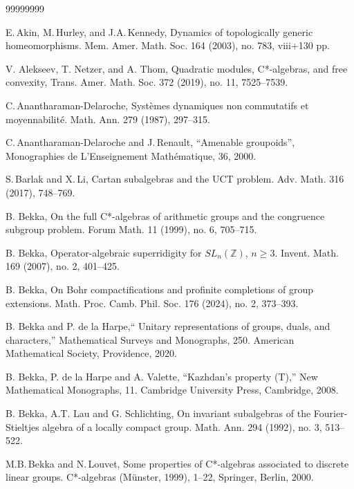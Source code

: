 \documentclass[11 pt, leqno, hidelinks]{amsart}%
\theoremstyle{plain}
\numberwithin{equation}{section}
\newcommand{\Z}{\mathbb{Z}}
\begin{document}
\begin{thebibliography}{99999999}
	
	
	
	 E.\,Akin, M.\,Hurley, and J.A.\,Kennedy,
	Dynamics of topologically generic homeomorphisms.
	Mem. Amer. Math. Soc. 164 (2003), no. 783, viii+130 pp.

 V. Alekseev, T. Netzer, and A. Thom, Quadratic modules, C*-algebras,
and free convexity, Trans. Amer. Math. Soc. 372 (2019), no. 11, 7525–7539.

	
	
	 C.\,Anantharaman-Delaroche, Syst\`emes dynamiques non commutatifs et moyennabilit\'e. Math. Ann. 279 (1987), 297--315.

 C.\,Anantharaman-Delaroche and J.\,Renault, ``Amenable groupoids'',  Monographies de L'Enseignement Math\'ematique, 36, 2000.

S.\,Barlak and X.\,Li, Cartan subalgebras and the UCT problem. Adv. Math. 316 (2017), 748--769.

B. Bekka, On the full C*-algebras of arithmetic groups and the congruence subgroup problem. Forum Math. 11 (1999), no. 6, 705--715.

B. Bekka, Operator-algebraic superridigity for $SL_n(\Z)$, $n\geqslant 3$. Invent. Math. 169 (2007), no. 2, 401--425.

 B. Bekka, On Bohr compactifications and profinite completions of group extensions. Math. Proc. Camb. Phil. Soc. 176 (2024), no. 2, 373--393.

 B. Bekka and P. de la Harpe,`` Unitary representations of groups, duals, and characters,'' Mathematical Surveys and Monographs, 250. American Mathematical Society, Providence, 2020.

B. Bekka, P. de la Harpe and A. Valette,   ``Kazhdan's property (T),'' New Mathematical Monographs, 11. Cambridge University Press, Cambridge, 2008.

	
 B. Bekka, A.T. Lau and G. Schlichting,
On invariant subalgebras of the Fourier-Stieltjes algebra of a locally compact group.
Math. Ann. 294 (1992), no. 3, 513--522.
	
 	M.B.\,Bekka and N.\,Louvet, Some properties of C*-algebras associated to discrete linear groups. C*-algebras (M\"unster, 1999), 1--22, Springer, Berlin, 2000.


\end{thebibliography}
\end{document}

